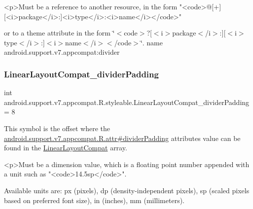 \begin{DoxyVerb}      <p>Must be a reference to another resource, in the form "<code>@[+][<i>package</i>:]<i>type</i>:<i>name</i></code>"
\end{DoxyVerb}
 or to a theme attribute in the form \char`\"{}$<$code$>$?\mbox{[}$<$i$>$package$<$/i$>$\+:\mbox{]}\mbox{[}$<$i$>$type$<$/i$>$\+:\mbox{]}$<$i$>$name$<$/i$>$$<$/code$>$\char`\"{}.  name android.\+support.\+v7.\+appcompat\+:divider \mbox{\label{classandroid_1_1support_1_1v7_1_1appcompat_1_1R_1_1styleable_aaa2b07fcbbf44f3762755b98ba2e1415}} 
\subsubsection{\texorpdfstring{Linear\+Layout\+Compat\+\_\+divider\+Padding}{LinearLayoutCompat\_dividerPadding}}
{\footnotesize\ttfamily int android.\+support.\+v7.\+appcompat.\+R.\+styleable.\+Linear\+Layout\+Compat\+\_\+divider\+Padding = 8\hspace{0.3cm}{\ttfamily [static]}}

This symbol is the offset where the \hyperlink{classandroid_1_1support_1_1v7_1_1appcompat_1_1R_1_1attr_a8e3b4563691b41794d6024946fd26078}{android.\+support.\+v7.\+appcompat.\+R.\+attr\#divider\+Padding} attribute\textquotesingle{}s value can be found in the \hyperlink{classandroid_1_1support_1_1v7_1_1appcompat_1_1R_1_1styleable_a765d32873526b8c36de14b184094582d}{Linear\+Layout\+Compat} array.

\begin{DoxyVerb}      <p>Must be a dimension value, which is a floating point number appended with a unit such as "<code>14.5sp</code>".
\end{DoxyVerb}
 Available units are\+: px (pixels), dp (density-\/independent pixels), sp (scaled pixels based on preferred font size), in (inches), mm (millimeters). 


